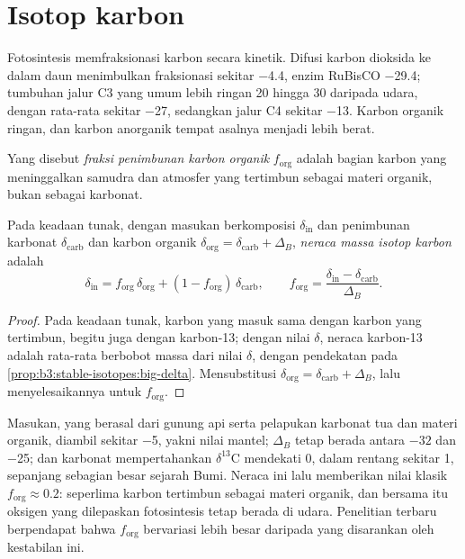 \section{Isotop karbon}\label{sec:b3:stable-isotopes:carbon}

Fotosintesis memfraksionasi karbon secara kinetik. Difusi karbon
dioksida ke dalam daun menimbulkan fraksionasi sekitar \qty{-4.4}{\permil}, enzim RuBisCO
\qty{-29.4}{\permil}; tumbuhan jalur C3 yang umum lebih ringan \num{20} hingga
\qty{30}{\permil} daripada udara, dengan rata-rata sekitar
\qty{-27}{\permil}, sedangkan jalur C4 sekitar \qty{-13}{\permil}. Karbon organik
ringan, dan karbon anorganik tempat asalnya menjadi lebih berat.

\begin{definition}\label{def:b3:stable-isotopes:forg}
Yang disebut \emph{fraksi penimbunan karbon organik}
$f_{\mathrm{org}}$ adalah bagian karbon yang meninggalkan samudra dan
atmosfer yang tertimbun sebagai materi organik, bukan sebagai karbonat.
\end{definition}

\begin{proposition}\label{prop:b3:stable-isotopes:forg}
Pada keadaan tunak, dengan masukan berkomposisi $\delta_{\mathrm{in}}$ dan penimbunan
karbonat $\delta_{\mathrm{carb}}$ dan karbon organik $\delta_{\mathrm{org}} =
\delta_{\mathrm{carb}} + \Delta_B$, \emph{neraca massa
isotop karbon} adalah
\[
\delta_{\mathrm{in}} = f_{\mathrm{org}}\,\delta_{\mathrm{org}} + (1 - f_{\mathrm{org}})\,
\delta_{\mathrm{carb}}, \qquad f_{\mathrm{org}} = \frac{\delta_{\mathrm{in}} -
\delta_{\mathrm{carb}}}{\Delta_B}.
\]
\end{proposition}

\begin{proof}
Pada keadaan tunak, karbon yang masuk sama dengan karbon yang tertimbun, begitu juga
dengan karbon-13; dengan nilai $\delta$, neraca karbon-13 adalah rata-rata berbobot massa
dari nilai $\delta$, dengan pendekatan pada
\cref{prop:b3:stable-isotopes:big-delta}. Mensubstitusi $\delta_{\mathrm{org}} =
\delta_{\mathrm{carb}} + \Delta_B$, lalu menyelesaikannya untuk $f_{\mathrm{org}}$.
\end{proof}

Masukan, yang berasal dari gunung api serta pelapukan karbonat tua dan
materi organik, diambil sekitar \qty{-5}{\permil}, yakni nilai mantel; $\Delta_B$ tetap
berada antara $-32$ dan \qty{-25}{\permil}; dan karbonat mempertahankan $\delta^{13}\mathrm C$
mendekati 0, dalam rentang sekitar \qty{1}{\permil}, sepanjang sebagian besar
sejarah Bumi. Neraca ini lalu memberikan nilai klasik $f_{\mathrm{org}} \approx
0.2$: seperlima karbon tertimbun sebagai materi organik, dan bersama itu
oksigen yang dilepaskan fotosintesis tetap berada di udara. Penelitian terbaru berpendapat bahwa
$f_{\mathrm{org}}$ bervariasi lebih besar daripada yang disarankan oleh kestabilan ini.

